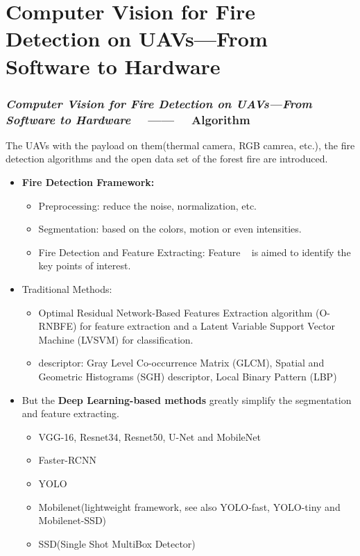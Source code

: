 \section{Computer Vision for Fire Detection on UAVs—From Software
to Hardware}

\begin{frame}
    \frametitle{\textit{Computer Vision for Fire Detection on UAVs—From Software
    to Hardware} ~~------~~ Algorithm}

    The UAVs with the payload on them(thermal camera, RGB camrea, etc.), the
    fire detection algorithms and the open data set of the forest fire are
    introduced.

    \begin{itemize}
        \item \textbf{Fire Detection Framework:}
            \begin{itemize}
                \item Preprocessing: reduce the noise, normalization, etc.
                \item Segmentation: based on the colors, motion or even intensities.
                \item Fire Detection and Feature Extracting: Feature ~ is aimed to
                    identify the key points of interest.
            \end{itemize}
        \item Traditional Methods:
            \begin{itemize}
                \item Optimal Residual Network-Based Features Extraction algorithm (O-RNBFE)
                    for feature extraction and a Latent Variable Support Vector Machine (LVSVM)
                    for classification.
                \item descriptor: Gray Level Co-occurrence Matrix (GLCM),
                    Spatial and Geometric Histograms (SGH) descriptor, Local
                    Binary Pattern (LBP)
            \end{itemize}

        \item But the \textbf{Deep Learning-based methods} greatly simplify the
            segmentation and feature extracting.
            \begin{itemize}
                \item VGG-16, Resnet34, Resnet50, U-Net and MobileNet
                \item Faster-RCNN
                \item YOLO
                \item Mobilenet(lightweight framework, see also YOLO-fast,
                    YOLO-tiny and Mobilenet-SSD)
                \item SSD(Single Shot MultiBox Detector)
            \end{itemize}


\end{itemize}
\end{frame}
